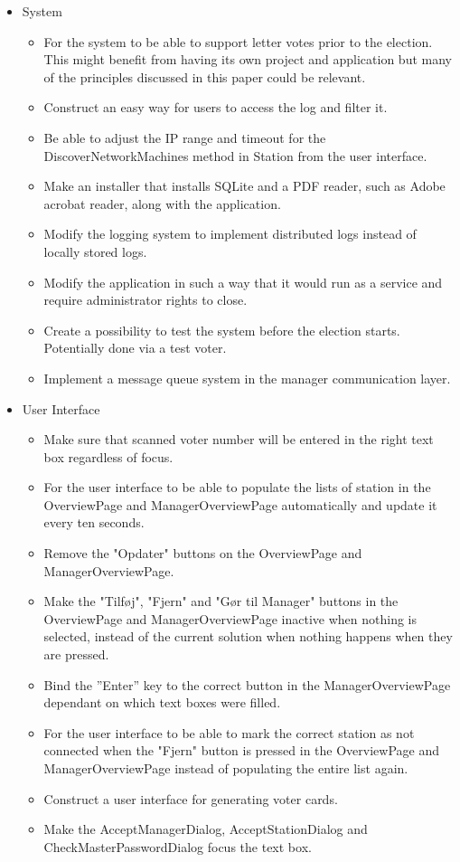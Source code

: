 \documentclass[a4paper]{report}
\begin{document}
\begin{itemize}
\item System
\begin{itemize}
\item For the system to be able to support letter votes prior to the election. This might benefit from having its own project and application but many of the principles discussed in this paper could be relevant.
\item Construct an easy way for users to access the log and filter it.
\item Be able to adjust the IP range and timeout for the DiscoverNetworkMachines method in Station from the user interface.
\item Make an installer that installs SQLite and a PDF reader, such as Adobe acrobat reader, along with the application. 
\item Modify the logging system to implement distributed logs instead of locally stored logs.
\item Modify the application in such a way that it would run as a service and require administrator rights to close.
\item Create a possibility to test the system before the election starts. Potentially done via a test voter.
\item Implement a message queue system in the manager communication layer.
\end{itemize}

\item User Interface
\begin{itemize}
\item Make sure that scanned voter number will be entered in the right text box regardless of focus.
\item For the user interface to be able to populate the lists of station in the OverviewPage and ManagerOverviewPage automatically and update it every ten seconds.
\item Remove the "Opdater" buttons on the OverviewPage and ManagerOverviewPage.
\item Make the "Tilf\o j", "Fjern" and "G\o r til Manager" buttons in the OverviewPage and ManagerOverviewPage inactive when nothing is selected, instead of the current solution when nothing happens when they are pressed.   
\item Bind the ''Enter'' key to the correct button in the ManagerOverviewPage dependant on which text boxes were filled.
\item For the user interface to be able to mark the correct station as not connected when the "Fjern" button is pressed in the OverviewPage and ManagerOverviewPage instead of populating the entire list again.
\item Construct a user interface for generating voter cards.
\item Make the AcceptManagerDialog, AcceptStationDialog and CheckMasterPasswordDialog focus the text box.
\end{itemize}
\end{itemize}
\end{document}
